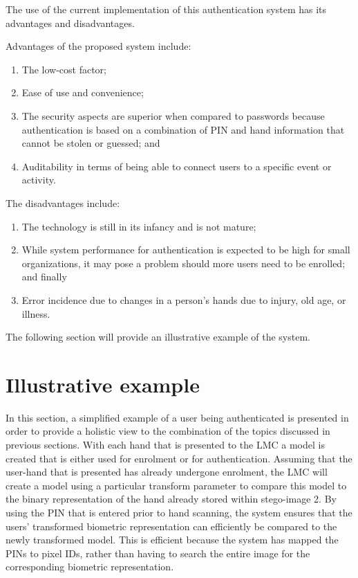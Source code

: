 The use of the current implementation of this authentication system has its advantages and disadvantages.


Advantages of the proposed system include:
    \begin{enumerate}[label=\roman*.]
        \item The low-cost factor; 
        \item Ease of use and convenience;
        \item The security aspects are superior when compared to passwords because authentication is based on a combination of PIN and hand information that cannot be stolen or guessed; and
        \item Auditability in terms of being able to connect users to a specific event or activity.
    \end{enumerate}
	
The disadvantages include: 
    \begin{enumerate}[label=\roman*.]
        \item The technology is still in its infancy and is not mature;
        \item While system performance for authentication is expected to be high for small organizations, it may pose a problem should more users need to be enrolled; and finally
        \item Error incidence due to changes in a person’s hands due to injury, old age, or illness.
    \end{enumerate}

The following section will provide an illustrative example of the system.

\section{Illustrative example}

In this section, a simplified example of a user being authenticated is presented in order to provide a holistic view to the combination of the topics discussed in previous sections.
With each hand that is presented to the LMC a model is created that is either used for enrolment or for authentication. Assuming that the user-hand that is presented has already undergone enrolment, the LMC will create a model using a particular transform parameter to compare this model to the binary representation of the hand already stored within stego-image 2. By using the PIN that is entered prior to hand scanning, the system ensures that the users’ transformed biometric representation can efficiently be compared to the newly transformed model. This is efficient because the system has mapped the PINs to pixel IDs, rather than having to search the entire image for the corresponding biometric representation.

